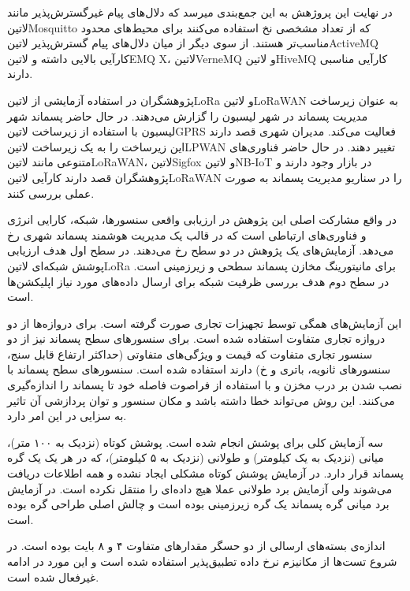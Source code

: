 در نهایت این پروژهش به این جمع‌بندی میرسد که دلال‌های پیام غیرگسترش‌پذیر مانند ‌لاتین{Mosquitto} که از تعداد مشخصی نخ استفاده می‌کنند برای محیط‌های محدود مناسب‌تر هستند.
از سوی دیگر از میان دلال‌های پیام گسترش‌پذیر ‌لاتین{ActiveMQ} کارآیی بالایی داشته و ‌لاتین{EMQ X}، ‌لاتین{VerneMQ} و ‌لاتین{HiveMQ} کارآیی مناسبی دارند.


پژوهشگران در  استفاده آزمایشی از ‌لاتین{LoRa} و ‌لاتین{LoRaWAN} به عنوان زیرساخت مدیریت پسماند در شهر لیسبون را گزارش می‌دهند.
در حال حاضر پسماند شهر لیسبون با استفاده از زیرساخت ‌لاتین{GPRS} فعالیت می‌کند. مدیران شهری قصد دارند این زیرساخت را به یک زیرساخت ‌لاتین{LPWAN} تغییر دهند.
در حال حاضر فناوری‌های متنوعی مانند ‌لاتین{LoRaWAN}، ‌لاتین{Sigfox} و ‌لاتین{NB-IoT} در بازار وجود دارند و پژوهشگران قصد دارند کارآیی ‌لاتین{LoRaWAN} را در
سناریو مدیریت پسماند به صورت عملی بررسی کنند.

در واقع مشارکت اصلی این پژوهش در ارزیابی واقعی سنسورها، شبکه، کارایی انرژی و فناوری‌های ارتباطی است که در قالب یک مدیریت هوشمند پسماند شهری رخ می‌دهد.
آزمایش‌های یک پژوهش در دو سطح رخ می‌دهند. در سطح اول هدف ارزیابی پوشش شبکه‌ای ‌لاتین{LoRa} برای مانیتورینگ مخازن پسماند سطحی و زیرزمینی است.
در سطح دوم هدف بررسی ظرفیت شبکه برای ارسال داده‌های مورد نیاز اپلیکشن‌ها است.

این آزمایش‌های همگی توسط تجهیزات تجاری صورت گرفته است. برای دروازه‌ها از دو دروازه تجاری متفاوت استفاده شده است.
برای سنسورهای سطح پسماند نیز از دو سنسور تجاری متفاوت که قیمت و ویژگی‌های متفاوتی (حداکثر ارتفاع قابل سنج، سنسورهای ثانویه، باتری و ‌خ) دارند استفاده شده است.
سنسورهای سطح پسماند با نصب شدن بر درب مخزن و با استفاده از فراصوت فاصله خود تا پسماند را اندازه‌گیری می‌کنند. این روش می‌تواند خطا داشته باشد
و مکان سنسور و توان پردازشی آن تاثیر به سزایی در این امر دارد.

سه آزمایش کلی برای پوشش انجام شده است. پوشش کوتاه (نزدیک به ۱۰۰ متر)، میانی (نزدیک به یک کیلومتر) و طولانی (نزدیک به ۵ کیلومتر)، که در هر یک یک گره پسماند قرار دارد.
در آزمایش پوشش کوتاه مشکلی ایجاد نشده و همه اطلاعات دریافت می‌شوند ولی آزمایش برد طولانی عملا هیچ داده‌ای را منتقل نکرده است.
در آزمایش برد میانی گره پسماند یک گره زیرزمینی بوده است و چالش اصلی طراحی گره بوده است.

اندازه‌ی بسته‌های ارسالی از دو حسگر مقدارهای متفاوت ۴ و ۸ بایت بوده است. در شروع تست‌ها از مکانیزم نرخ داده تطبیق‌پذیر استفاده شده است و این مورد در ادامه غیرفعال شده است.

